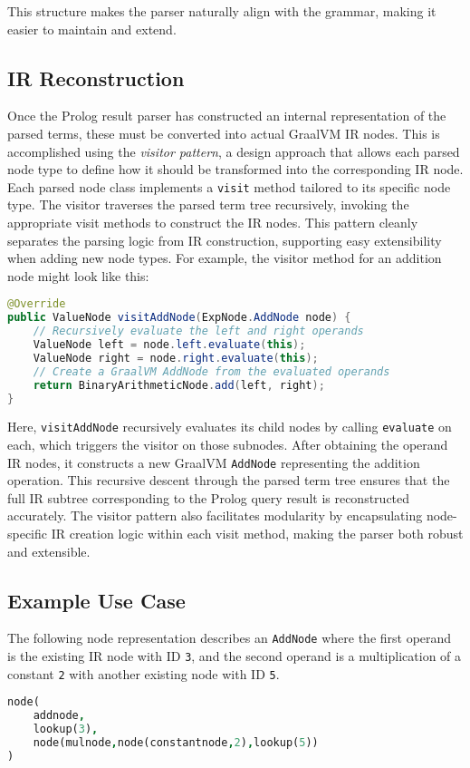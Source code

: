 This structure makes the parser naturally align with the grammar, making it easier to maintain and extend.

\subsection{IR Reconstruction}

Once the Prolog result parser has constructed an internal representation of the parsed terms, these must be converted into actual GraalVM IR nodes. This is accomplished using the \emph{visitor pattern}, a design approach that allows each parsed node type to define how it should be transformed into the corresponding IR node.
Each parsed node class implements a \texttt{visit} method tailored to its specific node type. The visitor traverses the parsed term tree recursively, invoking the appropriate visit methods to construct the IR nodes. This pattern cleanly separates the parsing logic from IR construction, supporting easy extensibility when adding new node types.
For example, the visitor method for an addition node might look like this:
\smallbreak
\begin{lstlisting}[language=Java]
@Override
public ValueNode visitAddNode(ExpNode.AddNode node) {
    // Recursively evaluate the left and right operands
    ValueNode left = node.left.evaluate(this);
    ValueNode right = node.right.evaluate(this);
    // Create a GraalVM AddNode from the evaluated operands
    return BinaryArithmeticNode.add(left, right);
}
\end{lstlisting}

Here, \texttt{visitAddNode} recursively evaluates its child nodes by calling \texttt{evaluate} on each, which triggers the visitor on those subnodes. After obtaining the operand IR nodes, it constructs a new GraalVM \texttt{AddNode} representing the addition operation.
This recursive descent through the parsed term tree ensures that the full IR subtree corresponding to the Prolog query result is reconstructed accurately. The visitor pattern also facilitates modularity by encapsulating node-specific IR creation logic within each visit method, making the parser both robust and extensible.

\subsection{Example Use Case}
The following node representation describes an \texttt{AddNode} where the first operand is the existing IR node with ID \texttt{3}, and the second operand is a multiplication of a constant \texttt{2} with another existing node with ID \texttt{5}.
\newpage
\begin{lstlisting}[language=Prolog]
node(
    addnode,
    lookup(3),
    node(mulnode,node(constantnode,2),lookup(5))
)
\end{lstlisting}

